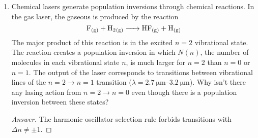 \documentclass[../psets.tex]{subfiles}
\begin{document}
\begin{enumerate}
\begin{proof}[Answer]
    \end{proof}
    \item Chemical lasers generate population inversions through chemical reactions. In the  gas laser, the gaseous  is produced by the reaction
    \begin{equation*}
        \ce{F_{(g)} + H2_{(g)} -> HF_{(g)} + H_{(g)}}
    \end{equation*}
    The major product of this reaction is  in the excited $n=2$ vibrational state. The reaction creates a population inversion in which $N(n)$, the number of molecules in each vibrational state $n$, is much larger for $n=2$ than $n=0$ or $n=1$. The output of the  laser corresponds to transitions between vibrational lines of the $n=2\to n=1$ transition ($\lambda=\SIrange{2.7}{3.2}{\micro\meter}$). Why isn't there any lasing action from $n=2\to n=0$ even though there is a population inversion between these states?
    \begin{proof}[Answer]
        The harmonic oscillator selection rule forbids transitions with $\Delta n\neq\pm 1$.
    \end{proof}
\end{enumerate}
\end{document}
